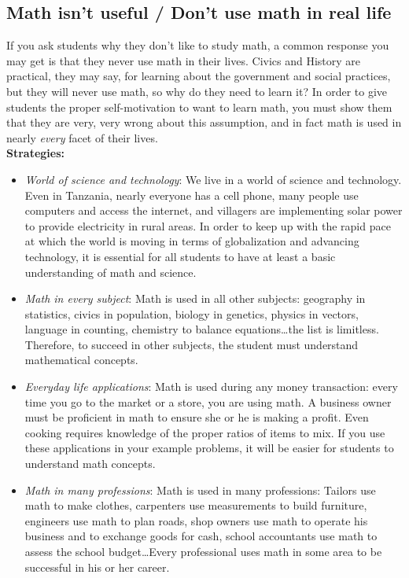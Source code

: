 \subsection{Math isn't useful / Don't use math in real life}
If you ask students why they don't like to study math, a common response you may get is that they never use math in their lives. Civics and History are practical, they may say, for learning about the government and social practices, but they will never use math, so why do they need to learn it? In order to give students the proper self-motivation to want to learn math, you must show them that they are very, very wrong about this assumption, and in fact math is used in nearly \emph{every} facet of their lives.\\

\textbf{Strategies:}
\begin{itemize}
\item\emph{World of science and technology}: We live in a world of science and technology. Even in Tanzania, nearly everyone has a cell phone, many people use computers and access the internet, and villagers are implementing solar power to provide electricity in rural areas. In order to keep up with the rapid pace at which the world is moving in terms of globalization and advancing technology, it is essential for all students to have at least a basic understanding of math and science.

\item\emph{Math in every subject}: Math is used in all other subjects: geography in statistics, civics in population, biology in genetics, physics in vectors, language in counting, chemistry to balance equations\ldots the list is limitless. Therefore, to succeed in other subjects, the student must understand mathematical concepts.

\item\emph{Everyday life applications}: Math is used during any money transaction: every time you go to the market or a store, you are using math. A business owner must be proficient in math to ensure she or he is making a profit. Even cooking requires knowledge of the proper ratios of items to mix. If you use these applications in your example problems, it will be easier for students to understand math concepts.

\item\emph{Math in many professions}: Math is used in many professions: Tailors use math to make clothes, carpenters use measurements to build furniture, engineers use math to plan roads, shop owners use math to operate his business
and to exchange goods for cash, school accountants use math to assess the school budget\ldots Every professional uses math in some area to be successful in his or her career.

\end{itemize}

